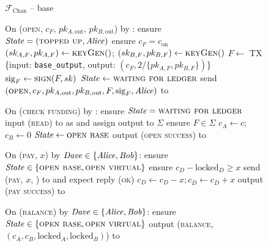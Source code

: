 \begin{figure}[H]
  \begin{systembox}{$\mathcal{F}_{\mathrm{Chan}}$ -- base}
    \begin{algorithmic}[1]
      \State On (\textsc{open}, $c_F$, $pk_{A, \mathrm{out}}$, $pk_{B,
      \mathrm{out}}$) by \alice:
      \Indent
        \State ensure $\mathit{State} = (\textsc{topped up}, \mathit{Alice})$
        \State ensure $c_F = c_{\mathrm{on}}$
        \State $(sk_{A, F}, pk_{A, F}) \gets \textsc{keyGen}()$; $(sk_{B, F},
        pk_{B, F}) \gets \textsc{keyGen}()$
        \State $F \gets$ TX \{input: \texttt{base\_output}, output: $(c_F,
        2/\{pk_{A, F}, pk_{B, F}\})$\}
        \State $\mathrm{sig}_F \gets \textsc{sign}(F, sk)$
        \State $\mathit{State} \gets \textsc{waiting for ledger}$
        \State send $(\textsc{open}, c_F, pk_{A, \mathrm{out}}, pk_{B,
        \mathrm{out}}, F, \mathrm{sig}_F, \mathit{Alice})$ to \adversary
      \EndIndent
      \Statex

      \State On (\textsc{check funding}) by \alice:
      \Indent
        \State ensure $\mathit{State} = \textsc{waiting for ledger}$
        \State input (\textsc{read}) to \ledger as \alice and assign output to
        $\Sigma$
        \State ensure $F \in \Sigma$
        \State $c_A \gets c$; $c_B \gets 0$
        \State $\mathit{State} \gets \textsc{open base}$
        \State output (\textsc{open success}) to \alice
      \EndIndent
      \Statex

      \State On (\textsc{pay}, $x$) by $\mathit{Dave} \in \{\mathit{Alice}, \mathit{Bob}\}$:
      \Indent
        \State ensure $\mathit{State} \in \{\textsc{open base}, \textsc{open
        virtual}\}$
        \State ensure $c_D - \mathrm{locked}_D \geq x$
        \State send (\textsc{pay}, $x$, \dave) to \adversary and expect reply
        (\textsc{ok})
        \State $c_D \gets c_D - x; c_{\bar{D}} \gets c_{\bar{D}} + x$
        \State output (\textsc{pay success}) to \dave
      \EndIndent
      \Statex

      \State On (\textsc{balance}) by $\mathit{Dave} \in \{\mathit{Alice}, \mathit{Bob}\}$:
      \Indent
        \State ensure $\mathit{State} \in \{\textsc{open base}, \textsc{open
        virtual}\}$
        \State output (\textsc{balance}, $(c_A, c_B, \mathrm{locked}_A,
        \mathrm{locked}_B)$) to \dave %
      \EndIndent
    \end{algorithmic}
  \end{systembox}
  \caption{}
  \label{code:functionality:chan:skeleton:base}
\end{figure}

